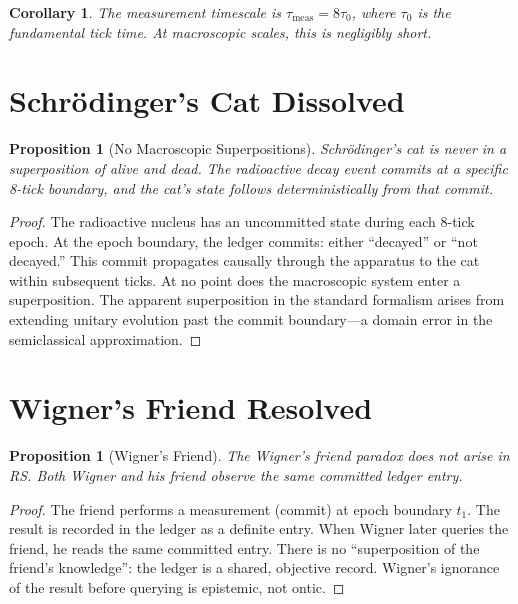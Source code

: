 \documentclass[12pt,a4paper]{article}
\newtheorem{corollary}[theorem]{Corollary}
\newtheorem{proposition}[theorem]{Proposition}
\theoremstyle{definition}
\theoremstyle{remark}
\begin{document}
\begin{corollary}
The measurement timescale is $\tau_{\mathrm{meas}} = 8\tau_0$,
where $\tau_0$ is the fundamental tick time.  At macroscopic scales,
this is negligibly short.
\end{corollary}

\section{Schr\"odinger's Cat Dissolved}
\label{sec:cat}

\begin{proposition}[No Macroscopic Superpositions]
\label{prop:cat}
Schr\"odinger's cat is never in a superposition of alive and dead.
The radioactive decay event commits at a specific 8-tick boundary,
and the cat's state follows deterministically from that commit.
\end{proposition}

\begin{proof}
The radioactive nucleus has an uncommitted state during each
8-tick epoch.  At the epoch boundary, the ledger commits:
either ``decayed'' or ``not decayed.''  This commit propagates
causally through the apparatus to the cat within subsequent ticks.
At no point does the macroscopic system enter a superposition.
The apparent superposition in the standard formalism arises from
extending unitary evolution past the commit boundary---a domain
error in the semiclassical approximation.
\end{proof}

\section{Wigner's Friend Resolved}
\label{sec:wigner}

\begin{proposition}[Wigner's Friend]
\label{prop:wigner}
The Wigner's friend paradox does not arise in RS.  Both Wigner and
his friend observe the same committed ledger entry.
\end{proposition}

\begin{proof}
The friend performs a measurement (commit) at epoch boundary $t_1$.
The result is recorded in the ledger as a definite entry.  When
Wigner later queries the friend, he reads the same committed
entry.  There is no ``superposition of the friend's knowledge'':
the ledger is a shared, objective record.  Wigner's ignorance
of the result before querying is epistemic, not ontic.
\end{proof}
\end{document}
